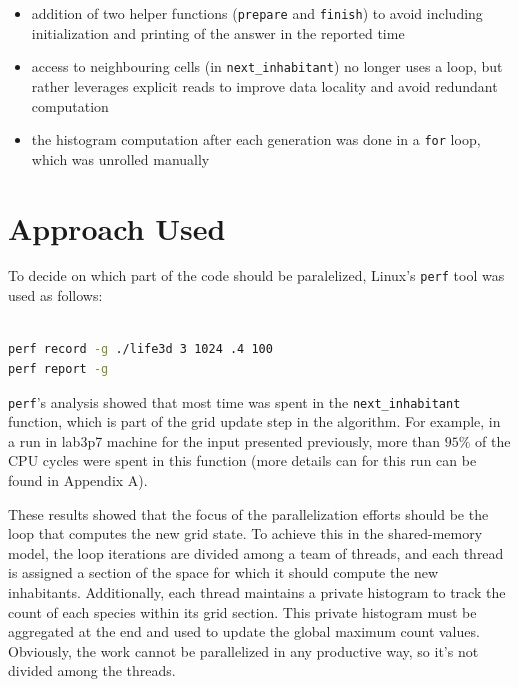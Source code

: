 \documentclass{article}
\begin{document}
\begin{itemize}
	\itemsep -0.2em
	\item addition of two helper functions (\texttt{prepare} and \texttt{finish})
		to avoid including initialization and printing of the answer in the reported time

	\item access to neighbouring cells (in \texttt{next\_inhabitant}) no longer uses a
		loop, but rather leverages explicit reads to improve data locality and avoid redundant
		computation

	\item the histogram computation after each generation was done in a
		\texttt{for} loop, which was unrolled manually
\end{itemize}

\section{Approach Used}

To decide on which part of the code should be paralelized, Linux's \texttt{perf}
tool was used as follows:

\begin{lstlisting}[language=bash,caption={Example usage of \texttt{perf} to identify
serial performance bottleneck}]

perf record -g ./life3d 3 1024 .4 100
perf report -g

\end{lstlisting}

\texttt{perf}'s analysis showed that most time was spent in the \texttt{next\_inhabitant}
function, which is part of the grid update step in the algorithm. For example,
in a run in lab3p7 machine for the input presented previously, more than $95\%$
of the CPU cycles were spent in this function (more details can for this run
can be found in Appendix A).

These results showed that the focus of the parallelization efforts should be the loop that
computes the new grid state. To achieve this in the
shared-memory model, the loop iterations are divided among a team of
threads, and each thread is assigned a section of the space for which it should compute the
new inhabitants. Additionally, each thread maintains a private histogram to track the count
of each species within its grid section. This private histogram must be aggregated
at the end and used to update the global maximum count values. Obviously, the
work cannot be parallelized in any productive way, so it's not divided among the threads.
\end{document}
